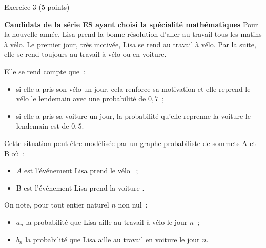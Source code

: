 
   \begin{h2}Exercice 3 (5 points)\end{h2}
          \textbf{Candidats de la série ES ayant choisi la spécialité \og mathématiques \fg{}}
          \bigbreak
          Pour la nouvelle année, Lisa prend la bonne résolution d'aller au travail tous les matins à
          vélo. Le premier jour, très motivée, Lisa se rend au travail à vélo. Par la suite, elle se rend toujours au travail à vélo ou en voiture.
          \par
          Elle se rend compte que~:
          \begin{indent}
               \begin{itemize}
                    \item si elle a pris son vélo un jour, cela renforce sa motivation et elle reprend le vélo le lendemain avec une probabilité de $0,7$~;
                    \item si elle a pris sa voiture un jour, la probabilité qu'elle reprenne la voiture le lendemain est de $0,5$.
               \end{itemize}
          \end{indent}
          Cette situation peut être modélisée par un graphe probabiliste de sommets A et B où~:
          \begin{indent}
               \begin{itemize}
                    \item $A$ est l'événement \og Lisa prend le vélo \fg{}~;
                    \item B est l'événement \og Lisa prend la voiture \fg.
               \end{itemize}
          \end{indent}
          On note, pour tout entier naturel $n$ non nul~:
          \begin{indent}
               \begin{itemize}
                    \item $a_n$ la probabilité que Lisa aille au travail à vélo le jour $n$~;
                    \item $b_n$ la probabilité que Lisa aille au travail en voiture le jour $n$.
               \end{itemize}
          \end{indent}
          \medbreak

